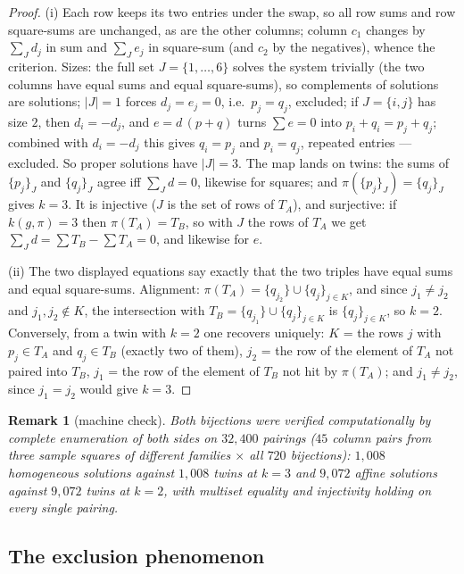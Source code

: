 \documentclass[11pt]{article}
\newtheorem{remark}[theorem]{Remark}
\begin{document}
\begin{proof}
(i) Each row keeps its two entries under the swap, so all row sums
and row square-sums are unchanged, as are the other columns; column
$c_1$ changes by $\sum_J d_j$ in sum and $\sum_J e_j$ in square-sum
(and $c_2$ by the negatives), whence the criterion. Sizes: the full
set $J=\{1,\dots,6\}$ solves the system trivially (the two columns
have equal sums and equal square-sums), so complements of solutions
are solutions; $|J|=1$ forces
$d_j=e_j=0$, i.e.\ $p_j=q_j$, excluded; if $J=\{i,j\}$ has size
$2$, then $d_i=-d_j$, and $e=d\,(p+q)$ turns $\sum e=0$ into
$p_i+q_i=p_j+q_j$; combined with $d_i=-d_j$ this gives $q_i=p_j$ and
$p_i=q_j$, repeated entries --- excluded. So proper solutions have
$|J|=3$. The map lands on twins: the sums of
$\{p_j\}_J$ and $\{q_j\}_J$ agree iff $\sum_J d=0$, likewise for
squares; and $\pi(\{p_j\}_J)=\{q_j\}_J$ gives $k=3$. It is injective
($J$ is the set of rows of $T_A$), and surjective: if $k(g,\pi)=3$
then $\pi(T_A)=T_B$, so with $J$ the rows of $T_A$ we get
$\sum_J d=\sum T_B-\sum T_A=0$, and likewise for $e$.

(ii) The two displayed equations say exactly that the two triples
have equal sums and equal square-sums. Alignment: $\pi(T_A)
=\{q_{j_2}\}\cup\{q_j\}_{j\in K}$, and since $j_1\ne j_2$ and
$j_1,j_2\notin K$, the intersection with
$T_B=\{q_{j_1}\}\cup\{q_j\}_{j\in K}$ is $\{q_j\}_{j\in K}$, so
$k=2$. Conversely, from a twin with $k=2$ one recovers uniquely: $K$
= the rows $j$ with $p_j\in T_A$ and $q_j\in T_B$ (exactly two of
them), $j_2$ = the row of the element of $T_A$ not paired into
$T_B$, $j_1$ = the row of the element of $T_B$ not hit by
$\pi(T_A)$; and $j_1\ne j_2$, since $j_1=j_2$ would give $k=3$.
\end{proof}

\begin{remark}[machine check]\label{rem:bijcheck}
Both bijections were verified computationally by complete enumeration
of both sides on $32{,}400$ pairings ($45$ column pairs from three
sample squares of different families $\times$ all $720$ bijections):
$1{,}008$ homogeneous solutions against $1{,}008$ twins at $k=3$ and
$9{,}072$ affine solutions against $9{,}072$ twins at $k=2$, with
multiset equality and injectivity holding on every single pairing.
\end{remark}

\subsection{The exclusion phenomenon}
\end{document}
